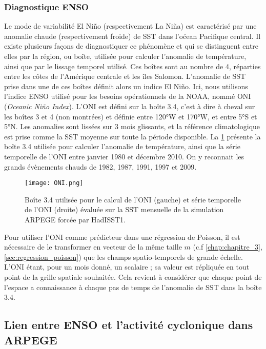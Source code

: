 \documentclass[../main.tex]{subfiles}
\begin{document}
\subsubsection{Diagnostique ENSO}\label{sec:diag_enso}

Le mode de variabilité El Niño (respectivement La Niña) est caractérisé par une anomalie chaude (respectivement froide) de SST dans l'oćean Pacifique central.
Il existe plusieurs façons de diagnostiquer ce phénomène et qui se distinguent entre elles par la région, ou boîte, utilisée pour calculer l'anomalie de
température, ainsi que par le lissage temporel utilisé. Ces boîtes sont au nombre de \num{4}, réparties entre les côtes de l'Amérique centrale et les îles
Salomon. L'anomalie de SST prise dans une de ces boîtes définit alors un indice El Niño. Ici, nous utilisons l'indice ENSO utilisé pour les besoins
opérationnels de la NOAA, nommé ONI (\textit{Oceanic Niño Index}). L'ONI est défini sur la boîte 3.4, c'est à dire à cheval sur les boîtes \num{3} et \num{4}
(non montrées) et définie entre \ang{120}W et \ang{170}W, et entre \ang{5}S et \ang{5}N. Les anomalies sont lissées sur \num{3} mois glissants, et la référence
climatologique est prise comme la SST moyenne sur toute la période disponible. La \cref{fig:ONI} présente la boîte 3.4 utilisée pour calculer l'anomalie de
température, ainsi que la série temporelle de l'ONI entre janvier \num{1980} et décembre \num{2010}. On y reconnait les grands évènements chauds de \num{1982},
\num{1987}, \num{1991}, \num{1997} et \num{2009}.

\begin{figure}[htpb]
    \centering
    \texttt{[image: ONI.png]}
    \caption{Boîte 3.4 utilisée pour le calcul de l'ONI (gauche) et série temporelle de l'ONI (droite) évaluée sur la SST mensuelle de la
    simulation ARPEGE forcée par HadISST1.}
    \label{fig:ONI}
\end{figure}

Pour utiliser l'ONI comme prédicteur dans une régression de Poisson, il est nécessaire de le transformer en vecteur de la même taille $m$ (c.f
\cref{chap:chapitre_3}, \cref{sec:regression_poisson}) que les champs spatio-temporels de grande échelle. L'ONI étant, pour un mois donné, un scalaire ; sa
valeur est répliquée en tout point de la grille spatiale souhaitée. Cela revient à considérer que chaque point de l'espace a connaissance à chaque
pas de temps de l'anomalie de SST dans la boîte 3.4.

\subsection{Lien entre ENSO et l'activité cyclonique dans ARPEGE}\label{sec:lien_enso_tracking}
\end{document}
